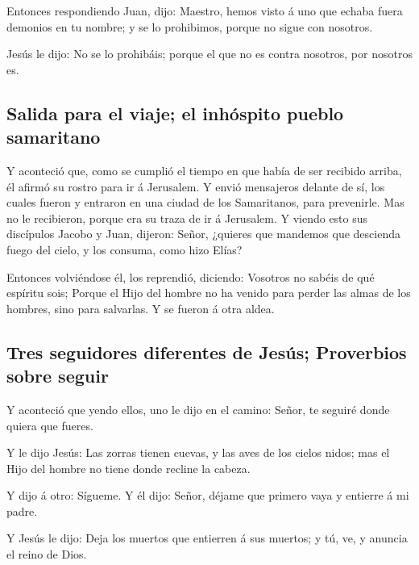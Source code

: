  Entonces respondiendo Juan, dijo: Maestro, hemos visto á
uno que echaba fuera demonios en tu nombre; y se lo prohibimos, porque
no sigue con nosotros.

 Jesús le dijo: No se lo prohibáis; porque el que no es
contra nosotros, por nosotros es.

\hypertarget{salida-para-el-viaje-el-inhuxf3spito-pueblo-samaritano}{%
\subsection{Salida para el viaje; el inhóspito pueblo
samaritano}\label{salida-para-el-viaje-el-inhuxf3spito-pueblo-samaritano}}

 Y aconteció que, como se cumplió el tiempo en que había
de ser recibido arriba, él afirmó su rostro para ir á Jerusalem.
 Y envió mensajeros delante de sí, los cuales fueron y
entraron en una ciudad de los Samaritanos, para prevenirle.
 Mas no le recibieron, porque era su traza de ir á
Jerusalem.  Y viendo esto sus discípulos Jacobo y Juan,
dijeron: Señor, ¿quieres que mandemos que descienda fuego del cielo, y
los consuma, como hizo Elías?

 Entonces volviéndose él, los reprendió, diciendo:
Vosotros no sabéis de qué espíritu sois;  Porque el Hijo
del hombre no ha venido para perder las almas de los hombres, sino para
salvarlas. Y se fueron á otra aldea.

\hypertarget{tres-seguidores-diferentes-de-jesuxfas-proverbios-sobre-seguir}{%
\subsection{Tres seguidores diferentes de Jesús; Proverbios sobre
seguir}\label{tres-seguidores-diferentes-de-jesuxfas-proverbios-sobre-seguir}}

 Y aconteció que yendo ellos, uno le dijo en el camino:
Señor, te seguiré donde quiera que fueres.

 Y le dijo Jesús: Las zorras tienen cuevas, y las aves de
los cielos nidos; mas el Hijo del hombre no tiene donde recline la
cabeza.

 Y dijo á otro: Sígueme. Y él dijo: Señor, déjame que
primero vaya y entierre á mi padre.

 Y Jesús le dijo: Deja los muertos que entierren á sus
muertos; y tú, ve, y anuncia el reino de Dios.

